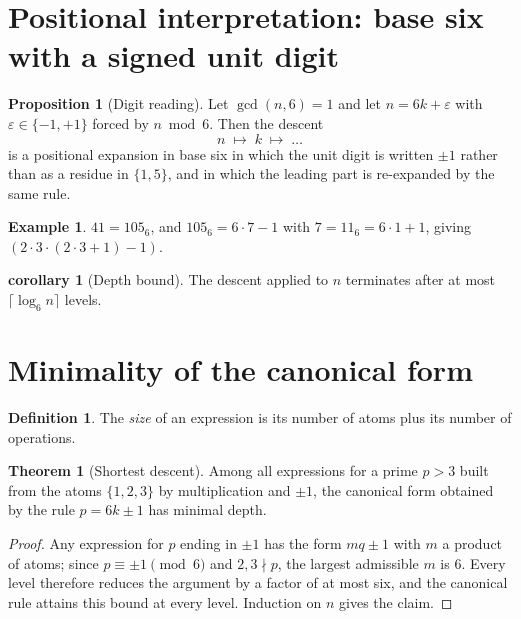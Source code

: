 \documentclass[11pt]{article}
\theoremstyle{definition}
\newtheorem{definition}{Definition}
\newtheorem{proposition}{Proposition}
\newtheorem{theorem}{Theorem}
\newtheorem{example}{Example}
\newtheorem{corollary}{corollary}
\begin{document}
\section{Positional interpretation: base six with a signed unit digit}

\begin{proposition}[Digit reading]
Let $\gcd(n,6)=1$ and let $n = 6k+\varepsilon$ with $\varepsilon\in\{-1,+1\}$
forced by $n \bmod 6$. Then the descent
\[
  n \;\longmapsto\; k \;\longmapsto\; \dots
\]
is a positional expansion in base six in which the unit digit is written
$\pm 1$ rather than as a residue in $\{1,5\}$, and in which the leading part is
re-expanded by the same rule.
\end{proposition}

\begin{example}
$41 = 105_6$, and $105_6 = 6\cdot 7 - 1$ with $7 = 11_6 = 6\cdot 1 + 1$, giving
$(2\cdot3\cdot(2\cdot3+1)-1)$.
\end{example}

\begin{corollary}[Depth bound]
The descent applied to $n$ terminates after at most
$\lceil \log_6 n \rceil$ levels.
\end{corollary}

\section{Minimality of the canonical form}

\begin{definition}
The \emph{size} of an expression is its number of atoms plus its number of
operations.
\end{definition}

\begin{theorem}[Shortest descent]
Among all expressions for a prime $p>3$ built from the atoms $\{1,2,3\}$ by
multiplication and $\pm1$, the canonical form obtained by the rule
$p = 6k\pm 1$ has minimal depth.
\end{theorem}

\begin{proof}
Any expression for $p$ ending in $\pm1$ has the form $mq \pm 1$ with $m$ a
product of atoms; since $p \equiv \pm1 \pmod 6$ and $2,3 \nmid p$, the largest
admissible $m$ is $6$. Every level therefore reduces the argument by a factor
of at most six, and the canonical rule attains this bound at every level.
Induction on $n$ gives the claim.
\end{proof}
\end{document}
